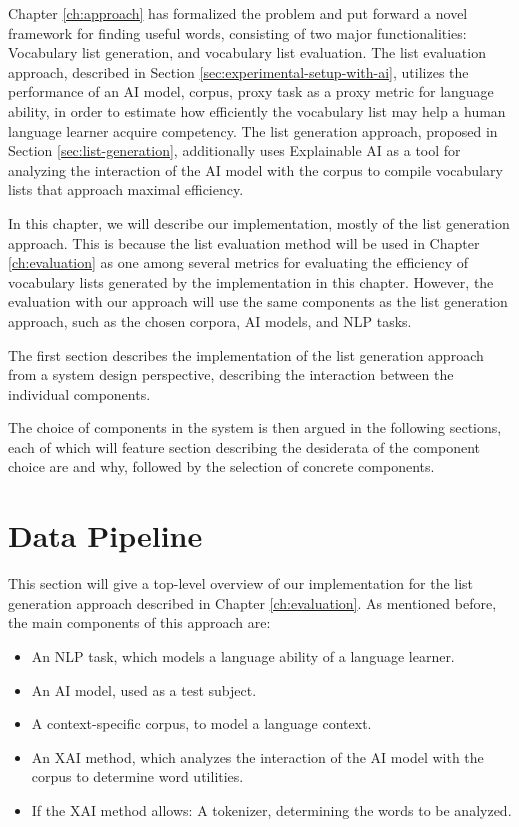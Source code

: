 Chapter \ref{ch:approach} has formalized the problem and put forward a novel framework for finding useful words, consisting of two major functionalities:
Vocabulary list generation, and vocabulary list evaluation.
The list evaluation approach, described in Section \ref{sec:experimental-setup-with-ai}, utilizes the performance of an AI model, corpus, proxy task as a proxy metric for language ability, in order to estimate how efficiently the vocabulary list may help a human language learner acquire competency.
The list generation approach, proposed in Section \ref{sec:list-generation}, additionally uses Explainable AI as a tool for analyzing the interaction of the AI model with the corpus to compile vocabulary lists that approach maximal efficiency.

In this chapter, we will describe our implementation, mostly of the list generation approach.
This is because the list evaluation method will be used in Chapter \ref{ch:evaluation} as one among several metrics for evaluating the efficiency of vocabulary lists generated by the implementation in this chapter.
However, the evaluation with our approach will use the same components as the list generation approach, such as the chosen corpora, AI models, and NLP tasks.

The first section describes the implementation of the list generation approach from a system design perspective, describing the interaction between the individual components.

The choice of components in the system is then argued in the following sections, each of which will feature section describing the desiderata of the component choice are and why, followed by the selection of concrete components.

\section{Data Pipeline}

This section will give a top-level overview of our implementation for the list generation approach described in Chapter \ref{ch:evaluation}.
As mentioned before, the main components of this approach are:

\begin{itemize}
	\item An NLP task, which models a language ability of a language learner.
	\item An AI model, used as a test subject.
	\item A context-specific corpus, to model a language context.
	\item An XAI method, which analyzes the interaction of the AI model with the corpus to determine word utilities.
	\item If the XAI method allows: A tokenizer, determining the words to be analyzed.
\end{itemize}

